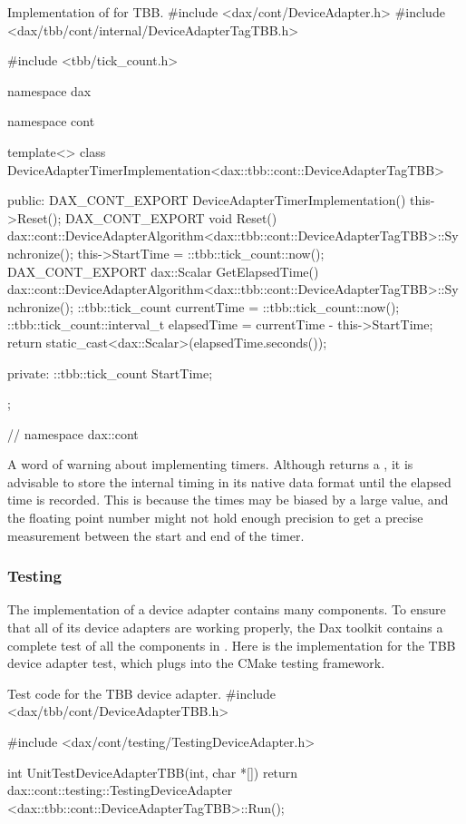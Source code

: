 \begin{daxexample}{Implementation of  for TBB.}
#include <dax/cont/DeviceAdapter.h>
#include <dax/tbb/cont/internal/DeviceAdapterTagTBB.h>

#include <tbb/tick_count.h>

namespace dax {
namespace cont {

template<>
class DeviceAdapterTimerImplementation<dax::tbb::cont::DeviceAdapterTagTBB>
{
public:
  DAX_CONT_EXPORT DeviceAdapterTimerImplementation()
  {
    this->Reset();
  }
  DAX_CONT_EXPORT void Reset()
  {
    dax::cont::DeviceAdapterAlgorithm<dax::tbb::cont::DeviceAdapterTagTBB>::Synchronize();
    this->StartTime = ::tbb::tick_count::now();
  }
  DAX_CONT_EXPORT dax::Scalar GetElapsedTime()
  {
    dax::cont::DeviceAdapterAlgorithm<dax::tbb::cont::DeviceAdapterTagTBB>::Synchronize();
    ::tbb::tick_count currentTime = ::tbb::tick_count::now();
    ::tbb::tick_count::interval_t elapsedTime = currentTime - this->StartTime;
    return static_cast<dax::Scalar>(elapsedTime.seconds());
  }

private:
  ::tbb::tick_count StartTime;
};

}
} // namespace dax::cont
\end{daxexample}

A word of warning about implementing timers. Although
 returns a , it is advisable to store
the internal timing in its native data format until the elapsed time is
recorded. This is because the times may be biased by a large value, and the
floating point number might not hold enough precision to get a precise
measurement between the start and end of the timer.

\subsubsection{Testing}

The implementation of a device adapter contains many components. To ensure
that all of its device adapters are working properly, the Dax toolkit
contains a complete test of all the components in
. Here is the
implementation for the TBB device adapter test, which plugs into the CMake
testing framework.

\begin{daxexample}{Test code for the TBB device adapter.}
#include <dax/tbb/cont/DeviceAdapterTBB.h>

#include <dax/cont/testing/TestingDeviceAdapter.h>

int UnitTestDeviceAdapterTBB(int, char *[])
{
  return dax::cont::testing::TestingDeviceAdapter
      <dax::tbb::cont::DeviceAdapterTagTBB>::Run();
}
\end{daxexample}


